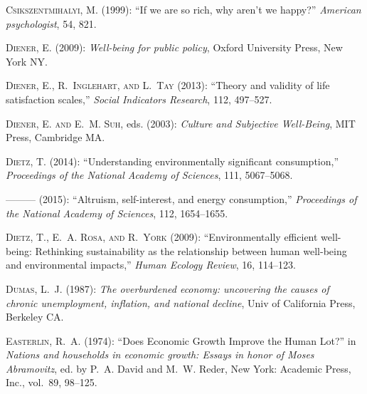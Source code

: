 \documentclass[10pt, letterpaper]{article}
\begin{document}
\begin{spacing}{1.0}
\begin{thebibliography}{49}
\textsc{Csikszentmihalyi, M.} (1999): \enquote{If we are so rich, why aren't we
  happy?} \emph{American psychologist}, 54, 821.

\textsc{Diener, E.} (2009): \emph{Well-being for public policy}, Oxford
  University Press, New York NY.

\textsc{Diener, E., R.~Inglehart, and L.~Tay} (2013): \enquote{Theory and
  validity of life satisfaction scales,} \emph{Social Indicators Research},
  112, 497--527.

\textsc{Diener, E. and E.~M. Suh}, eds. (2003): \emph{Culture and Subjective
  Well-Being}, MIT Press, Cambridge MA.

\textsc{Dietz, T.} (2014): \enquote{Understanding environmentally significant
  consumption,} \emph{Proceedings of the National Academy of Sciences}, 111,
  5067--5068.

---\hspace{-.1pt}---\hspace{-.1pt}--- (2015): \enquote{Altruism, self-interest,
  and energy consumption,} \emph{Proceedings of the National Academy of
  Sciences}, 112, 1654--1655.

\textsc{Dietz, T., E.~A. Rosa, and R.~York} (2009): \enquote{Environmentally
  efficient well-being: Rethinking sustainability as the relationship between
  human well-being and environmental impacts,} \emph{Human Ecology Review}, 16,
  114--123.

\textsc{Dumas, L.~J.} (1987): \emph{The overburdened economy: uncovering the
  causes of chronic unemployment, inflation, and national decline}, Univ of
  California Press, Berkeley CA.

\textsc{Easterlin, R.~A.} (1974): \enquote{Does Economic Growth Improve the
  Human Lot?} in \emph{Nations and households in economic growth: Essays in
  honor of Moses Abramovitz}, ed. by P.~A. David and M.~W. Reder, New York:
  Academic Press, Inc., vol.~89, 98--125.


\end{thebibliography}
\end{spacing}
\end{document}
